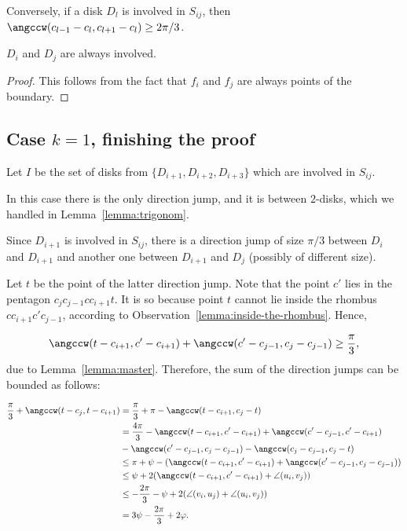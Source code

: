 \begin{enumerate}[label={\bf Case \arabic*: }, wide, labelwidth=!, labelindent=0pt]
Conversely, if a disk $D_l$ is involved in $S_{ij}$, then $\angccw(c_{l-1} - c_l, c_{l+1} - c_l)\geq 2\pi/3$.

\begin{observation}
$D_i$ and $D_j$ are always involved.
\end{observation}

\begin{proof}
This follows from the fact that $f_i$ and $f_j$ are always points of the boundary.
\end{proof}

\subsection{Case $k = 1$, finishing the proof}

Let $I$ be the set of disks from $\{D_{i+1}, D_{i+2}, D_{i+3}\}$ which are involved in $S_{ij}$.


In this case there is the only direction jump, and it is between $2$-disks, which we handled in Lemma~\ref{lemma:trigonom}.


Since $D_{i+1}$ is involved in $S_{ij}$, there is a direction jump of size $\pi/3$ between $D_i$ and $D_{i+1}$ and another one between $D_{i+1}$ and $D_j$ (possibly of different size).

Let $t$ be the point of the latter direction jump.
Note that the point $c'$ lies in the pentagon $c_{j}c_{j-1}cc_{i+1}t$. It is so because point $t$ cannot lie inside the rhombus $cc_{i+1}c'c_{j-1}$, according to Observation~\ref{lemma:inside-the-rhombus}. Hence,

$$\angccw(t - c_{i+1}, c' - c_{i+1}) + \angccw(c' - c_{j-1}, c_j - c_{j-1})\geq\frac{\pi}{3},$$
due to Lemma~\ref{lemma:master}. Therefore, the sum of the direction jumps can be bounded as follows:

\begin{align*}
\frac{\pi}{3} + \angccw(t - c_j, t - c_{i+1}) & = \frac{\pi}{3} + \pi - \angccw(t - c_{i+1}, c_j - t) \\
& = \frac{4\pi}{3} - \angccw(t - c_{i+1}, c' - c_{i+1}) + \angccw(c' - c_{j-1}, c' - c_{i+1}) \\ & - \angccw(c' - c_{j-1}, c_j - c_{j-1}) - \angccw(c_j - c_{j-1}, c_j - t) \\
& \leq \pi + \psi - (\angccw(t - c_{i+1}, c' - c_{i+1}) + \angccw(c' - c_{j-1}, c_j - c_{j-1})) \\
& \leq \psi + 2(\angccw(t - c_{i+1}, c' - c_{i+1}) + \angle(u_i, v_j)) \\
& \leq -\frac{2\pi}{3} - \psi + 2(\angle(v_i, u_j) + \angle(u_i, v_j)) \\
& = 3\psi - \frac{2\pi}{3} + 2\varphi.
\end{align*}


\end{enumerate}
